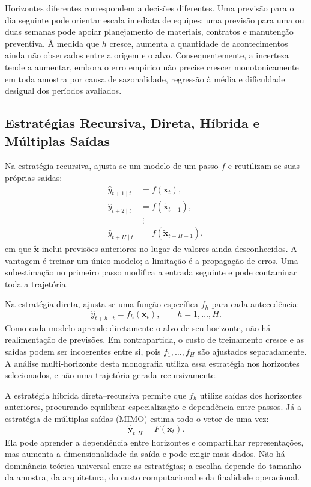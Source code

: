Horizontes diferentes correspondem a decisões diferentes. Uma previsão para o dia seguinte pode orientar escala imediata de equipes; uma previsão para uma ou duas semanas pode apoiar planejamento de materiais, contratos e manutenção preventiva. À medida que $h$ cresce, aumenta a quantidade de acontecimentos ainda não observados entre a origem e o alvo. Consequentemente, a incerteza tende a aumentar, embora o erro empírico não precise crescer monotonicamente em toda amostra por causa de sazonalidade, regressão à média e dificuldade desigual dos períodos avaliados.

\subsection{Estratégias Recursiva, Direta, Híbrida e Múltiplas Saídas}

Na estratégia recursiva, ajusta-se um modelo de um passo $f$ e reutilizam-se suas próprias saídas:
\begin{align}
    \hat{y}_{t+1\mid t} &= f(\mathbf{x}_t),\\
    \hat{y}_{t+2\mid t} &= f(\widetilde{\mathbf{x}}_{t+1}),\\
    &\ \vdots\\
    \hat{y}_{t+H\mid t} &= f(\widetilde{\mathbf{x}}_{t+H-1}),
\end{align}
em que $\widetilde{\mathbf{x}}$ inclui previsões anteriores no lugar de valores ainda desconhecidos. A vantagem é treinar um único modelo; a limitação é a propagação de erros. Uma subestimação no primeiro passo modifica a entrada seguinte e pode contaminar toda a trajetória.

Na estratégia direta, ajusta-se uma função específica $f_h$ para cada antecedência:
\begin{equation}
    \hat{y}_{t+h\mid t}=f_h(\mathbf{x}_t),
    \qquad h=1,\ldots,H.
    \label{eq:estrategia_direta}
\end{equation}
Como cada modelo aprende diretamente o alvo de seu horizonte, não há realimentação de previsões. Em contrapartida, o custo de treinamento cresce e as saídas podem ser incoerentes entre si, pois $f_1,\ldots,f_H$ são ajustados separadamente. A análise multi-horizonte desta monografia utiliza essa estratégia nos horizontes selecionados, e não uma trajetória gerada recursivamente.

A estratégia híbrida direta--recursiva permite que $f_h$ utilize saídas dos horizontes anteriores, procurando equilibrar especialização e dependência entre passos. Já a estratégia de múltiplas saídas (MIMO) estima todo o vetor de uma vez:
\begin{equation}
    \widehat{\mathbf{y}}_{t,H}=F(\mathbf{x}_t).
\end{equation}
Ela pode aprender a dependência entre horizontes e compartilhar representações, mas aumenta a dimensionalidade da saída e pode exigir mais dados. Não há dominância teórica universal entre as estratégias; a escolha depende do tamanho da amostra, da arquitetura, do custo computacional e da finalidade operacional.

